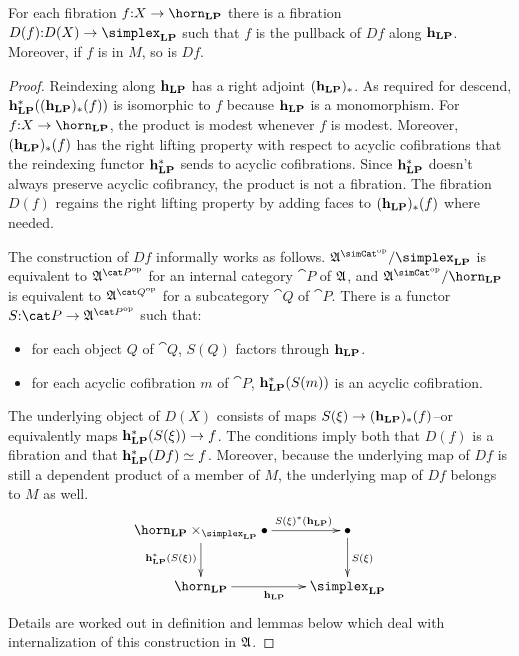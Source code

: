 \documentclass[csh.tex]{subfiles}
\begin{document}
\begin{lemma}
For each fibration $f\of X\to \horn_\LP$ there is a fibration $D(f)\of D(X)\to\simplex_\LP$ such that $f$ is the pullback of $Df$ along $\mathbf{h}_{\mathbf{LP}}$. Moreover, if $f$ is in $M$, so is $Df$.\label{descent}
\end{lemma}

\newcommand\dsum[1]{\Sigma_{#1}}
\begin{proof}
Reindexing along $\mathbf{h}_{\mathbf{LP}}$ has a right adjoint $(\mathbf{h}_{\mathbf{LP}})_*$. As required for descend, $\mathbf{h}_{\mathbf{LP}}^*((\mathbf{h}_{\mathbf{LP}})_*(f))$ is isomorphic to $f$ because $\mathbf{h}_{\mathbf{LP}}$ is a monomorphism. For $f\of X\to \horn_\LP$, the product is modest whenever $f$ is modest. Moreover, $(\mathbf{h}_{\mathbf{LP}})_*(f)$ has the right lifting property with respect to acyclic cofibrations that the reindexing functor $\mathbf{h}_{\mathbf{LP}}^*$ sends to acyclic cofibrations. Since $\mathbf{h}_{\mathbf{LP}}^*$ doesn't always preserve acyclic cofibrancy, the product is not a fibration. The fibration $D(f)$ regains the right lifting property by adding faces to $(\mathbf{h}_{\mathbf{LP}})_*(f)$ where needed.

The construction of $Df$ informally works as follows.
$\ambient\s/\simplex_\LP$ is equivalent to $\ambient^{\cat P\dual}$ for an internal category $\cat P$ of $\mathfrak A$, and $\ambient\s/\horn_\LP$ is equivalent to $\ambient^{\cat Q\dual}$ for a subcategory $\cat Q$ of $\cat P$. There is a functor $S\of\cat P\to \ambient^{\cat P\dual}$ such that: %
\begin{itemize}
\item for each object $Q$ of $\cat Q$, $S(Q)$ factors through $\mathbf{h}_{\mathbf{LP}}$.
\item for each acyclic cofibration $m$ of $\cat P$, $\mathbf{h}_{\mathbf{LP}}^*(S(m))$ is an acyclic cofibration.
\end{itemize}
The underlying object of $D(X)$ consists of maps $S(\xi)\to(\mathbf{h}_{\mathbf{LP}})_*(f)$--or equivalently maps $\mathbf{h}_{\mathbf{LP}}^*(S(\xi))\to f$. %
The conditions imply both that $D(f)$ is a fibration and that $\mathbf{h}_{\mathbf{LP}}^*(Df) \simeq f$. %
Moreover, because the underlying map of $Df$ is still a dependent product of a member of $M$, the underlying map of $Df$ belongs to $M$ as well. %
\[\xymatrix{
\horn_\LP\times_{\simplex_\LP}\bullet\ar[r]^(.7){S(\xi)\ri(\foh_\LP)}\ar[d]_{\foh_\LP\ri(S(\xi))} & \bullet\ar[d]^{S(\xi)}\\
\horn_\LP \ar[r]_{\foh_\LP} & \simplex_\LP
}\]
Details are worked out in definition and lemmas below which deal with internalization of this construction in $\mathfrak A$.
\end{proof}
\end{document}
